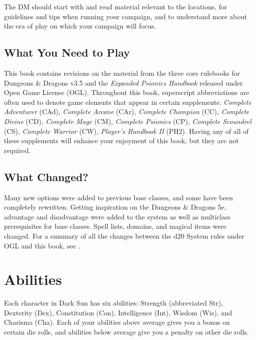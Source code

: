 The DM should start with  and read material relevant to the locations,  for guidelines and tips when running your campaign, and  to understand more about the era of play on which your campaign will focus.


\subsection{What You Need to Play}
This book contains revisions on the material from the three core rulebooks for {\tableheader Dungeons \& Dragons v3.5} and the \emph{Expanded Psionics Handbook} released under Open Game License (OGL). Throughout this book, superscript abbreviations are often used to denote game elements that appear in certain supplements: \emph{Complete Adventurer} (CAd), \emph{Complete Arcane} (CAr), \emph{Complete Champion} (CC), \emph{Complete Divine} (CD), \emph{Complete Mage} (CM), \emph{Complete Psionics} (CP), \emph{Complete Scoundrel} (CS), \emph{Complete Warrior} (CW), \emph{Player's Handbook II} (PH2). Having any of all of these supplements will enhance your enjoyment of this book, but they are not required.


\subsection{What Changed?}
Many new options were added to previous base classes, and some have been completely rewritten. Getting inspiration on the {\tableheader Dungeons \& Dragons 5e}, advantage and disadvantage were added to the system as well as multiclass prerequisites for base classes. Spell lists, domains, and magical items were changed. For a summary of all the changes between the d20 System rules under OGL and this book, see .






\section{Abilities}
Each character in {\tableheader Dark Sun} has six abilities: Strength (abbreviated Str), Dexterity (Dex), Constitution (Con), Intelligence (Int), Wisdom (Wis), and Charisma (Cha). Each of your abilities above average gives you a bonus on certain die rolls, and abilities below average give you a penalty on other die rolls.


